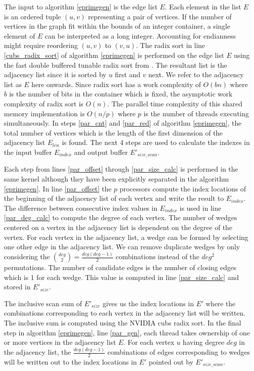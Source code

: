 \documentclass[conference]{IEEEtran}
\begin{document}
The input to algorithm \ref{eprimegen} is the edge list $E$. Each element in the list $E$ is an ordered tuple $(u,v)$ representing a pair of vertices. If the number of vertices in the graph fit within the bounds of an integer container, a single element of $E$ can be interpreted as a long integer. Accounting for endianness might require reordering $(u,v)$ to $(v,u)$. The radix sort in line \ref{cubs_radix_sort} of algorithm \ref{eprimegen} is performed on the edge list $E$ using the fast double buffered tunable radix sort from \cite{b19}. The resultant list is the adjacency list since it is sorted by $u$ first and $v$ next. We refer to the adjacency list as $E$ here onwards. Since radix sort has a work complexity of $O(bn)$ where $b$ is the number of bits in the container which is fixed, the asymptotic work complexity of radix sort is $O(n)$. The parallel time complexity of this shared memory implementation is $O(n/p)$ where $p$ is the number of threads executing simultaneously. In steps \ref{par_cnt} and \ref{par_red} of algorithm \ref{eprimegen}, the total number of vertices which is the length of the first dimension of the adjacency list $E_{len}$ is found. The next 4 steps are used to calculate the indexes in the input buffer $E_{index}$ and output buffer $E'_{size\_scan}$. 

Each step from lines \ref{par_offset} through \ref{par_size_calc} is performed in the same kernel although they have been explicitly separated in the algorithm \ref{eprimegen}. In line \ref{par_offset} the $p$ processors compute the index locations of the beginning of the adjacency list of each vertex and write the result to $E_{index}$. The difference between consecutive index values in $E_{index}$ is used in line \ref{par_deg_calc} to compute the degree of each vertex. The number of wedges centered on a vertex in the adjacency list is dependent on the degree of the vertex. For each vertex in the adjacency list, a wedge can be formed by selecting one other edge in the adjacency list. We can remove duplicate wedges by only considering the ${deg \choose 2}=\frac{deg(deg-1)}{2}$ combinations instead of the $deg^2$ permutations. The number of candidate edges is the number of closing edges which is 1 for each wedge. This value is computed in line \ref{par_size_calc} and stored in $E'_{size}$.

The inclusive scan sum of $E'_{size}$ gives us the index locations in $E'$ where the combinations corresponding to each vertex in the adjacency list will be written. The inclusive sum is computed using the NVIDIA cubs radix sort\cite{b19}. In the final step in algorithm \ref{eprimegen}, line \ref{par_gen}, each thread takes ownership of one or more vertices in the adjacency list $E$. For each vertex $u$ having degree $deg$ in the adjacency list, the $\frac{deg(deg-1)}{2}$ combinations of edges corresponding to wedges will be written out to the index locations in $E'$ pointed out by $E'_{size\_scan}$.
\end{document}
